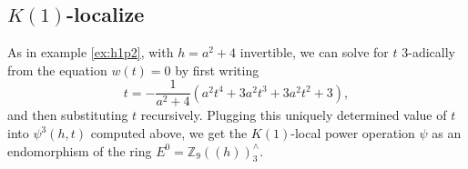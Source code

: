 \documentclass{gtpart}
\theoremstyle{definition}
\theoremstyle{remark}
\newcommand{\mb}[1]{\mathbb{#1}}
\begin{document}
\subsection{$K(1)$-localize}
\label{subsec:step3}

As in example \ref{ex:h1p2}, with $h = a^2 + 4$ invertible, we can 
solve for $t$ 3-adically from the equation $w(t) = 0$ by first writing 
\[
 t = -\frac{1}{a^2 + 4}(a^2 t^4 + 3 a^2 t^3 + 3 a^2 t^2 + 3),
\]
and then substituting $t$ recursively.  Plugging this uniquely determined 
value of $t$ into $\psi^3(h,t)$ computed above, 
we get the $K(1)$-local power operation $\psi$ as an endomorphism of the 
ring $E^0 = {\mb Z}_9 (\!(h)\!)_3^\wedge$.  


\nocite{*}


\end{document}
